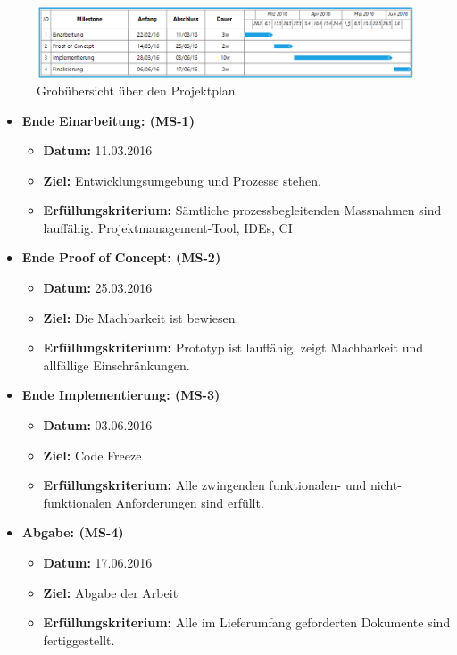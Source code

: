 \begin{figure}[ht]
	\centering
	\includegraphics[width=\textwidth]{images/projplan.png}
	\caption{Grobübersicht über den Projektplan}
	\label{Risk result}
\end{figure}

\begin{itemize}
	\item{\textbf{Ende Einarbeitung: (MS-1)} 
		\begin{itemize}
			\item{\textbf{Datum:} 11.03.2016}
			\item{\textbf{Ziel:} Entwicklungsumgebung und Prozesse stehen.}
			\item{\textbf{Erfüllungskriterium:} Sämtliche prozessbegleitenden Massnahmen sind lauffähig. Projektmanagement-Tool, IDEs, CI}
		\end{itemize}
	}
	
	\item{\textbf{Ende Proof of Concept: (MS-2)} 
		\begin{itemize}
			\item{\textbf{Datum:} 25.03.2016}
			\item{\textbf{Ziel:} Die Machbarkeit ist bewiesen.}
			\item{\textbf{Erfüllungskriterium:} Prototyp ist lauffähig, zeigt Machbarkeit und allfällige Einschränkungen.}
		\end{itemize}
	}
	
	\item{\textbf{Ende Implementierung: (MS-3)} 
		\begin{itemize}
			\item{\textbf{Datum:} 03.06.2016}
			\item{\textbf{Ziel:} Code Freeze}
			\item{\textbf{Erfüllungskriterium:} Alle zwingenden funktionalen- und nicht-funktionalen Anforderungen sind erfüllt.}
		\end{itemize}
	}	
	\item{\textbf{Abgabe: (MS-4)} 
			\begin{itemize}
				\item{\textbf{Datum:} 17.06.2016}
				\item{\textbf{Ziel:} Abgabe der Arbeit}
				\item{\textbf{Erfüllungskriterium:} Alle im Lieferumfang geforderten Dokumente sind fertiggestellt.}
			\end{itemize}
	}
	
\end{itemize}

